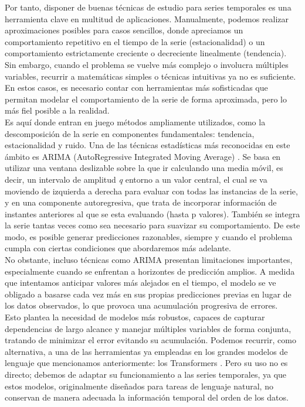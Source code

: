 Por tanto, disponer de buenas técnicas de estudio para series temporales es una herramienta clave en multitud de aplicaciones. Manualmente, podemos realizar aproximaciones posibles para casos sencillos, donde apreciamos un comportamiento repetitivo en el tiempo de la serie (estacionalidad) o un comportamiento estrictamente creciente o decreciente linealmente (tendencia). Sin embargo, cuando el problema se vuelve más complejo o involucra múltiples variables, recurrir a matemáticas simples o técnicas intuitivas ya no es suficiente. En estos casos, es necesario contar con herramientas más sofisticadas que permitan modelar el comportamiento de la serie de forma aproximada, pero lo más fiel posible a la realidad.\\

Es aquí donde entran en juego métodos ampliamente utilizados, como la descomposición de la serie en componentes fundamentales: tendencia, estacionalidad y ruido. Una de las técnicas estadísticas más reconocidas en este ámbito es ARIMA (AutoRegressive Integrated Moving Average) \cite{10.5555/574978}. Se basa en utilizar una ventana deslizable sobre la que ir calculando una media móvil, es decir, un intervalo de amplitud \textit{q} entorno a un valor central, el cual se va moviendo de izquierda a derecha para evaluar con todas las instancias de la serie, y en una componente autoregresiva, que trata de incorporar información de instantes anteriores al que se esta evaluando (hasta p valores). También se integra la serie tantas veces como sea necesario para suavizar su comportamiento. De este modo, es posible generar predicciones razonables, siempre y cuando el problema cumpla con ciertas condiciones que abordaremos más adelante.\\

No obstante, incluso técnicas como ARIMA presentan limitaciones importantes, especialmente cuando se enfrentan a horizontes de predicción amplios. A medida que intentamos anticipar valores más alejados en el tiempo, el modelo se ve obligado a basarse cada vez más en sus propias predicciones previas en lugar de los datos observados, lo que provoca una acumulación progresiva de errores.\\

Esto plantea la necesidad de modelos más robustos, capaces de capturar dependencias de largo alcance y manejar múltiples variables de forma conjunta, tratando de minimizar el error evitando su acumulación. Podemos recurrir, como alternativa, a una de las herramientas ya empleadas en los grandes modelos de lenguaje que mencionamos anteriormente: los Transformers \cite{vaswani2023attentionneed}. Pero su uso no es directo; debemos de adaptar su funcionamiento a las series temporales, ya que estos modelos, originalmente diseñados para tareas de lenguaje natural, no conservan de manera adecuada la información temporal del orden de los datos.
